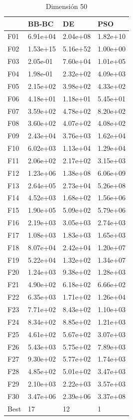 \begin{table}[H]
    \begin{minipage}{.5\linewidth}
      \caption{Dimensión 50}
      \centering
      \begin{tabular}{llll}
        \toprule
        {} &     BB-BC &        DE &       PSO \\
        \midrule
        F01  &  6.91e+04 &  2.04e+08 &  1.82e+10 \\
        F02  &  1.53e+15 &  5.16e+52 &  1.00e+00 \\
        F03  &  2.05e-01 &  7.60e+04 &  1.01e+05 \\
        F04  &  1.98e-01 &  2.32e+02 &  4.09e+03 \\
        F05  &  2.15e+02 &  3.98e+02 &  4.33e+02 \\
        F06  &  4.18e+01 &  1.18e+01 &  5.45e+01 \\
        F07  &  3.59e+02 &  4.78e+02 &  8.20e+02 \\
        F08  &  3.60e+02 &  4.07e+02 &  4.08e+02 \\
        F09  &  2.43e+04 &  3.76e+03 &  1.62e+04 \\
        F10  &  6.02e+03 &  1.13e+04 &  1.29e+04 \\
        F11  &  2.06e+02 &  2.17e+02 &  3.15e+03 \\
        F12  &  1.23e+06 &  1.38e+08 &  6.06e+09 \\
        F13  &  2.64e+05 &  2.73e+04 &  5.26e+08 \\
        F14  &  4.52e+03 &  1.68e+02 &  1.56e+06 \\
        F15  &  1.90e+05 &  5.09e+02 &  5.79e+06 \\
        F16  &  2.19e+03 &  3.05e+03 &  2.74e+03 \\
        F17  &  1.08e+03 &  1.83e+03 &  1.65e+03 \\
        F18  &  8.07e+04 &  2.42e+04 &  1.20e+07 \\
        F19  &  5.22e+04 &  1.32e+02 &  1.34e+07 \\
        F20  &  1.24e+03 &  9.38e+02 &  1.28e+03 \\
        F21  &  4.90e+02 &  6.18e+02 &  6.66e+02 \\
        F22  &  6.35e+03 &  1.71e+02 &  1.26e+04 \\
        F23  &  7.71e+02 &  8.43e+02 &  1.10e+03 \\
        F24  &  8.34e+02 &  8.85e+02 &  1.21e+03 \\
        F25  &  4.61e+02 &  5.67e+02 &  3.07e+03 \\
        F26  &  5.43e+03 &  5.75e+02 &  7.89e+03 \\
        F27  &  9.30e+02 &  5.77e+02 &  1.74e+03 \\
        F28  &  4.85e+02 &  5.01e+02 &  3.47e+03 \\
        F29  &  2.10e+03 &  2.22e+03 &  3.57e+03 \\
        F30  &  3.47e+06 &  2.39e+06 &  3.37e+08 \\
        Best &        17 &        12 &         1 \\
        \bottomrule
        \end{tabular}
        

\end{minipage}
\end{table}
